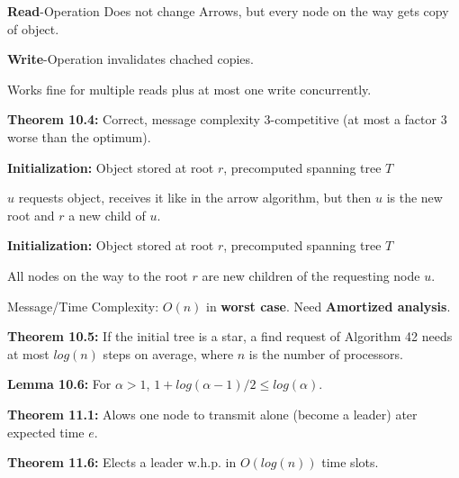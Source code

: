 {
	\begin{items}
		\item {\bf Read}-Operation Does not change Arrows, but every node on the way gets copy of object.
		\item {\bf Write}-Operation invalidates chached copies.
		\item Works fine for multiple reads plus at most one write concurrently.
		\item {\bf Theorem 10.4:} Correct, message complexity $3$-competitive (at most a factor $3$ worse than the optimum).
	\end{items}
}

{
	\begin{items}
		\item {\bf Initialization:} Object stored at root $r$, precomputed spanning tree $T$
		\item $u$ requests object, receives it like in the arrow algorithm, but then $u$ is the new root and $r$ a new child of $u$.
	\end{items}
}

{
	\begin{items}
		\item {\bf Initialization:} Object stored at root $r$, precomputed spanning tree $T$
		\item All nodes on the way to the root $r$ are new children of the requesting node $u$.
		\item Message/Time Complexity: $O(n)$ in {\bf worst case}. Need {\bf Amortized analysis}.
		\item {\bf Theorem 10.5:} If the initial tree is a star, a find request of Algorithm 42 needs 
			at most $log(n)$ steps on average, where $n$ is the number of processors.
		\item {\bf Lemma 10.6:} For $\alpha>1$, $1+log(\alpha-1)/2\le log(\alpha)$.
	\end{items}
}



{
	\begin{items}
		\item {\bf Theorem 11.1:} Alows one node to transmit alone (become a leader) ater expected time $e$.
		\item {\bf Theorem 11.6:} Elects a leader w.h.p. in $O(log(n))$ time slots.
	\end{items}
}


